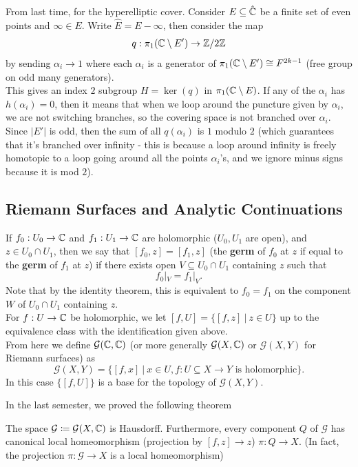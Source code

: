 \documentclass{article}
\begin{document}
{From last time, for the hyperelliptic cover. Consider $E \subseteq \hat{\mathbb{C}}$ be a finite set of even points and $\infty \in E$. Write $\hat{E} = E - \infty$, then consider the map
\[q: \pi_1(\mathbb{C} \setminus E') \to \mathbb{Z}/2\mathbb{Z}\]
by sending $\alpha_i \to 1$ where each $\alpha_i$ is a generator of $\pi_1(\mathbb{C} \setminus E') \cong F^{2k-1}$ (free group on odd many generators).\\

 This gives an index $2$ subgroup $H = \ker(q)$ in $\pi_1(\mathbb{C} \setminus E)$. If any of the $\alpha_i$ has $h(\alpha_i) = 0$, then it means that when we loop around the puncture given by $\alpha_i$, we are not switching branches, so the covering space is not branched over $\alpha_i$. Since $|E'|$ is odd, then the sum of all $q(\alpha_i)$ is $1$ modulo $2$ (which guarantees that it's branched over infinity - this is because a loop around infinity is freely homotopic to a loop going around all the points $\alpha_i$'s, and we ignore minus signs because it is mod $2$).

 \subsection{Riemann Surfaces and Analytic Continuations}

 \begin{definition}
     If $f_0: U_0 \to \mathbb{C}$ and $f_1: U_1 \to \mathbb{C}$ are holomorphic ($U_0, U_1$ are open), and $z \in U_0 \cap U_1$, then we say that $[f_0, z] = [f_1, z]$ (the \textbf{germ} of $f_0$ at $z$ if equal to the \textbf{germ} of $f_1$ at $z$) if there exists open $V \subseteq U_0 \cap U_1$ containing $z$ such that
     \[f_0|_V = f_1|_V.\]
     Note that by the identity theorem, this is equivalent to $f_0 = f_1$ on the component $W$ of $U_0 \cap U_1$ containing $z$.\\
     
     For $f: U \to \mathbb{C}$ be holomorphic, we let $[f, U] = \{[f, z]\ |\ z \in U\}$ up to the equivalence class with the identification given above.\\

     From here we define $\mathcal{G}(\mathbb{C}, \mathbb{C})$ (or more generally $\mathcal{G}(X, \mathbb{C})$ or $\mathcal{G}(X, Y)$ for Riemann surfaces) as
     \[\mathcal{G}(X, Y) = \{[f, x]\ |\ x \in U, f: U \subseteq X \to Y \text{ is holomorphic}\}.\]
     In this case $\{[f, U]\}$ is a base for the topology of $\mathcal{G}(X, Y)$.
 \end{definition}

In the last semester, we proved the following theorem
 \begin{theorem}
     The space $\mathcal{G} \coloneqq \mathcal{G}(X, \mathbb{C})$ is Hausdorff. Furthermore, every component $Q$ of $\mathcal{G}$ has canonical local homeomorphism (projection by $[f, z] \to z$) $\pi: Q \to X$. (In fact, the projection $\pi: \mathcal{G} \to X$ is a local homeomorphism)\\
     

\end{theorem}}
\end{document}
